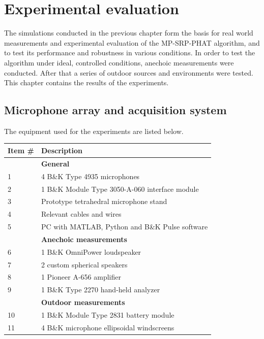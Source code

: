 \chapter{Experimental evaluation} \label{sec:experimentsoutside}
The simulations conducted in the previous chapter form the basis for real world measurements and experimental evaluation of the MP-SRP-PHAT algorithm, and to test its performance and robustness in various conditions. In order to test the algorithm under ideal, controlled conditions, anechoic measurements were conducted. After that a series of outdoor sources and environments were tested. This chapter contains the results of the experiments. 

\section{Microphone array and acquisition system}
The equipment used for the experiments are listed below.
\begin{table}[!ht]
    \centering
	\begin{tabular}{ll} \toprule
	{Item \#}	&	{Description}\\
	    \bottomrule 
	        &   \textbf{{General}}                                       \\
	    1   &   4 B\&K  Type 4935 microphones                            \\
	    2   &   1 B\&K Module Type 3050-A-060 interface module           \\
	    3   &   Prototype tetrahedral microphone stand                   \\
		4   &   Relevant cables and wires                                \\
		5   &   PC with MATLAB, Python and B\&K Pulse software           \\
		\bottomrule 
            &  \textbf{{Anechoic measurements}}                           \\
		6	&   1 B\&K OmniPower loudspeaker                              \\
		7   &   2 custom spherical speakers                               \\
		8   &   1 Pioneer A-656 amplifier                                 \\
		9   &   1 B\&K Type 2270 hand-held analyzer                       \\
		\bottomrule 
		    &   \textbf{{Outdoor measurements}}                           \\
		10  &   1 B\&K Module Type 2831 battery module                    \\
		11  &   4 B\&K microphone ellipsoidal windscreens                  \\
		\bottomrule 
	\end{tabular}
\end{table}

